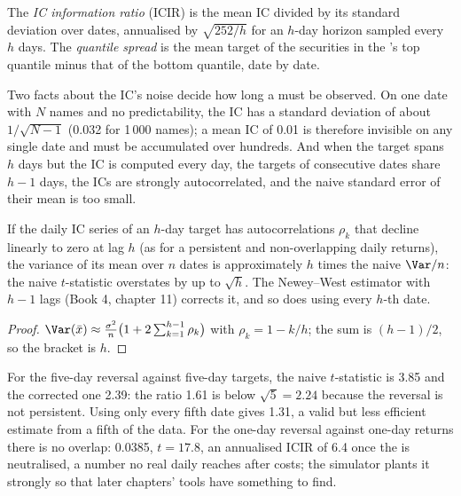 \begin{definition}\label{def:rs:anatomy-of-a-predictor:icir}
The \emph{IC information ratio} (ICIR) is the mean IC divided by its standard deviation over dates,
annualised by $\sqrt{252/h}$ for an $h$-day horizon sampled every $h$ days. The \emph{quantile spread} is
the mean target of the securities in the 's top quantile minus that of the bottom quantile, date by date.
\end{definition}

Two facts about the IC's noise decide how long a  must be observed. On one date with $N$ names and no predictability,
the IC has a standard deviation of about $1/\sqrt{N - 1}$ (0.032 for 1\,000 names); a mean IC of 0.01 is therefore invisible on any
single date and must be accumulated over hundreds. And when the target spans $h$ days but the IC is computed every day, the
targets of consecutive dates share $h - 1$ days, the ICs are strongly autocorrelated, and the naive standard error of their mean
is too small.

\begin{proposition}\label{prop:rs:anatomy-of-a-predictor:overlap}
If the daily IC series of an $h$-day target has autocorrelations $\rho_k$ that decline linearly to zero at lag $h$ (as for a
persistent  and non-overlapping daily returns), the variance of its mean over $n$ dates is approximately $h$ times the
naive $\Var/n$: the naive $t$-statistic overstates by up to $\sqrt h$. The Newey--West estimator with $h - 1$ lags (Book 4,
chapter 11) corrects it, and so does using every $h$-th date.
\end{proposition}

\begin{proof}
$\Var(\bar x) \approx \frac{\sigma^2}{n}\bigl(1 + 2\sum_{k=1}^{h-1}\rho_k\bigr)$ with $\rho_k = 1 - k/h$; the sum is $(h - 1)/2$, so the
bracket is $h$.
\end{proof}

For the five-day reversal against five-day targets, the naive $t$-statistic is 3.85 and the corrected one 2.39: the ratio 1.61 is
below $\sqrt5 = 2.24$ because the reversal is not persistent. Using only every fifth date gives 1.31, a valid but less efficient
estimate from a fifth of the data. For the one-day reversal against one-day returns there is no overlap: 0.0385, $t = 17.8$, an
annualised ICIR of 6.4 once the  is neutralised, a number no real daily  reaches after costs; the simulator
plants it strongly so that later chapters' tools have something to find.


